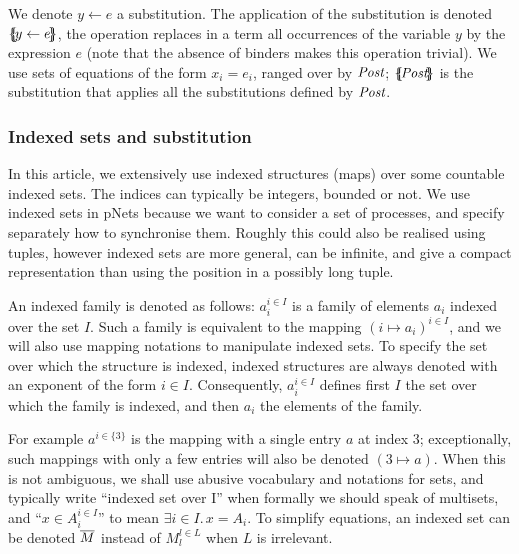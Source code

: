 \documentclass{lncs/llncs}
\begin{document}
\smallskip

We denote $y\gets e$ a substitution. The application of the substitution is denoted
$\{\hspace{-0.88ex}\{\!y\gets e\!\}\hspace{-0.87ex}\}$, the operation replaces in a term all occurrences 
of the variable $y$ by the expression $e$ (note that the absence of binders makes this operation 
trivial). 
We use sets of equations of the form $x_i=e_i$, ranged over by $\Post$; $\subst{\Post}$ is the substitution that applies all the substitutions defined by $\Post$.


\subsubsection*{Indexed sets and substitution}



In this article, we extensively use indexed structures
(maps) over some countable indexed sets.   The indices can typically be
integers, bounded or not. We use indexed sets in pNets because we want to consider a set of processes, and specify separately how to synchronise them. Roughly this could also be realised using tuples, however indexed sets are more general, can be infinite, and give a compact representation than using the position in a possibly long tuple.

An indexed family is denoted as
follows: $a_i^{i\in I}$ is a family of elements $a_i$ indexed over the
set $I$. Such a family
is equivalent to the mapping $(i\mapsto a_i)^{i\in I}$, and we will also use mapping 
notations to manipulate indexed sets.
To specify the set over which the structure is indexed, 
indexed structures are always denoted with an exponent of the form $i\in I$.
Consequently, $a_i^{i\in I}$ defines first $I$ the set over which the
family is indexed, and then $a_i$ the elements of the family.

For example $a^{i\in\{3\}}$ is
the mapping with a single entry $a$ at index $3$; exceptionally, such mappings with
only a few entries will also be denoted $(3\mapsto a)$.
When this is not ambiguous, we shall use abusive vocabulary and
notations for sets, and typically write ``indexed set over I'' when  
formally we should speak of multisets, and ``$x\in
A_i^{i\in I}$'' to mean $\exists i\in I.\, x=A_i$.
To simplify equations, an indexed set can be denoted $\overline{M}$
instead of $M_l^{l\in L}$ when $L$ is irrelevant.
\end{document}
